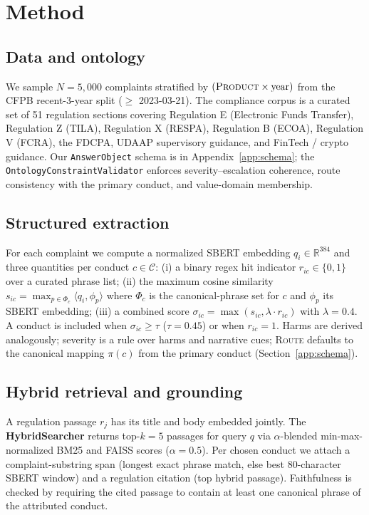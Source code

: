 \documentclass[11pt]{article}
\begin{document}
\section{Method}\label{sec:method}

\subsection{Data and ontology}\label{sec:method-data}

We sample $N=5{,}000$ complaints stratified by $(\textsc{Product} \times \text{year})$
from the CFPB recent-3-year split (\(\geq\) 2023-03-21).
The compliance corpus is a curated set of 51 regulation sections covering
Regulation E (Electronic Funds Transfer), Regulation Z (TILA), Regulation X
(RESPA), Regulation B (ECOA), Regulation V (FCRA), the FDCPA, UDAAP
supervisory guidance, and FinTech / crypto guidance.
Our \texttt{AnswerObject} schema is in Appendix~\ref{app:schema}; the
\texttt{OntologyConstraintValidator} enforces severity--escalation
coherence, route consistency with the primary conduct, and value-domain
membership.

\subsection{Structured extraction}\label{sec:method-extract}

For each complaint we compute a normalized SBERT embedding
$q_i \in \mathbb{R}^{384}$ and three quantities per conduct
$c \in \mathcal{C}$: (i) a binary regex hit indicator
$r_{ic} \in \{0,1\}$ over a curated phrase list; (ii) the maximum cosine
similarity $s_{ic} = \max_{p \in \Phi_c} \langle q_i, \phi_p \rangle$ where
$\Phi_c$ is the canonical-phrase set for $c$ and $\phi_p$ its SBERT
embedding; (iii) a combined score
$\sigma_{ic} = \max(s_{ic}, \lambda \cdot r_{ic})$ with $\lambda=0.4$.
A conduct is included when $\sigma_{ic} \geq \tau$ ($\tau=0.45$) or when
$r_{ic}=1$. Harms are derived analogously; severity is a rule over harms and
narrative cues; \textsc{Route} defaults to the canonical mapping
$\pi(c)$ from the primary conduct (Section~\ref{app:schema}).

\subsection{Hybrid retrieval and grounding}\label{sec:method-retrieve}

A regulation passage $r_j$ has its title and body embedded jointly. The
\textbf{HybridSearcher} returns top-$k=5$ passages for query
$q$ via $\alpha$-blended min-max-normalized BM25 and FAISS scores
($\alpha=0.5$). Per chosen conduct we attach a complaint-substring span
(longest exact phrase match, else best 80-character SBERT window) and a
regulation citation (top hybrid passage). Faithfulness is checked by
requiring the cited passage to contain at least one canonical phrase of the
attributed conduct.
\end{document}
